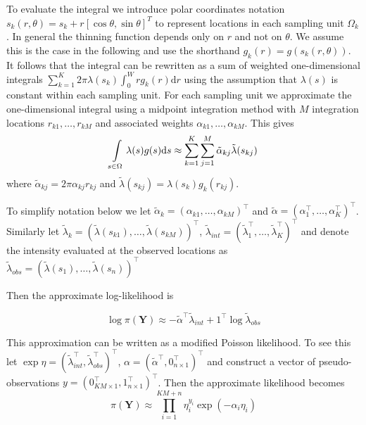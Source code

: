 \documentclass[preprint,12pt]{elsarticle}
\newcommand{\bm}{\boldsymbol}  %
\newcommand{\tl}{\tilde{\lambda}}   %
\begin{document}
To evaluate the integral we introduce polar coordinates notation $s_k(r, \theta) = s_k + r\left[\cos\theta, \sin\theta \right]^T$ to represent locations in each sampling unit $\Omega_k$.   In general the thinning function depends only on $r$ and not on $\theta$.  We assume this is the case in the following and use the shorthand $g_k(r) = g(s_k(r, \theta))$. It follows that the integral can be rewritten as a sum of weighted one-dimensional integrals $\sum_{k=1}^K 2\pi \lambda(s_k) \int_0^W r g_k(r)\mathrm{d}r$ using the assumption that $\lambda(s)$ is constant within each sampling unit.  For each sampling unit we approximate the one-dimensional integral using a midpoint integration method with $M$ integration locations $r_{k1}, \ldots, r_{kM}$ and associated weights $\alpha_{k1}, \ldots, \alpha_{kM}$.  This gives
\begin{equation*}
	\int\displaylimits_{s \in \Omega} \lambda(s)g(s)\mathrm{d}s \approx \sum_{k=1}^K \sum_{j=1}^M \tilde{\alpha}_{kj} \tl(s_{kj}) 
\end{equation*}
where $\tilde{\alpha}_{kj} = 2\pi \alpha_{kj}r_{kj}$ and $\tl(s_{kj}) = \lambda(s_k) g_k(r_{kj})$.  

To simplify notation below we let $\tilde{\alpha}_{k} = (\alpha_{k1}, \ldots, \alpha_{kM})^\intercal$ and $\tilde{\alpha} = (\alpha_1^\intercal, \ldots, \alpha_K^\intercal)^\intercal$.  Similarly let $\tl_k = (\tl(s_{k1}), \ldots, \tl(s_{kM}))^\intercal$, $\tl_{int} = (\tl_1^\intercal, \ldots, \tl_K^\intercal)^\intercal$ and denote the intensity evaluated at the observed locations as $\tl_{obs} = (\tl(s_1), \ldots, \tl(s_n))^\intercal$

Then the approximate log-likelihood is

\begin{equation}
\label{approx-log-likelihood}
	\log \pi(\bm{Y}) \approx - \tilde{\alpha}^\intercal \tl_{int} + 1^\intercal\log\tl_{obs}
\end{equation}

This approximation can be written as a modified Poisson likelihood.  To see this let $\exp \eta = (\tl_{int}^\intercal, \tl_{obs}^\intercal)^\intercal$, 
$\alpha = (\tilde{\alpha}^\intercal, 0_{n \times 1}^\intercal)^\intercal$ and construct a vector of pseudo-observations $y = (0_{KM\times 1}^\intercal, 1_{n \times 1}^\intercal)^\intercal$.  Then the approximate likelihood becomes
\begin{equation}
\pi(\bm{Y}) \approx \prod_{i=1}^{KM + n} \eta_i^{y_i}\exp(-\alpha_i\eta_i)
\end{equation}
\end{document}
